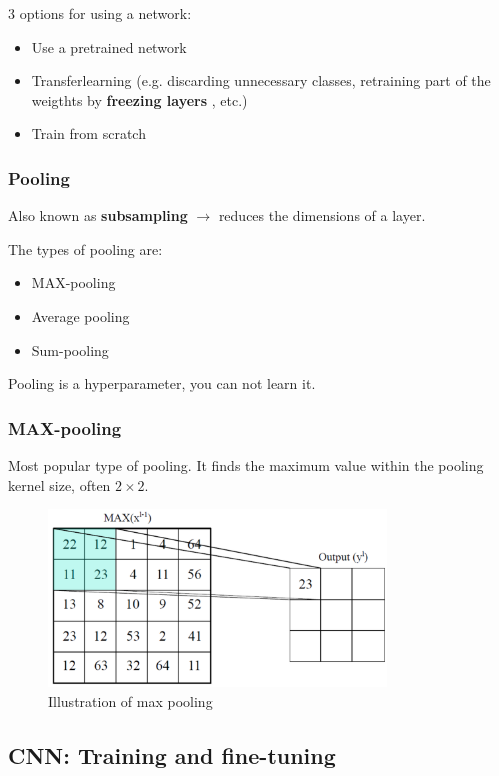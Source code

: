 \documentclass[a4paper]{article}
\begin{document}
3 options for using a network:
\begin{itemize}
	\item Use a pretrained network
	\item Transferlearning (e.g. discarding unnecessary classes, retraining part of the weigthts by \textbf{freezing layers} , etc.)
	\item Train from scratch
\end{itemize}

\subsubsection{Pooling}
Also known as \textbf{subsampling} $ \rightarrow $ reduces the dimensions of a layer.

The types of pooling are:
\begin{itemize}
	\item MAX-pooling
	\item Average pooling
	\item Sum-pooling
\end{itemize}

Pooling is a hyperparameter, you can not learn it. 

\subsubsection*{MAX-pooling}
Most popular type of pooling. 
It finds the maximum value within the pooling kernel size, often $ 2 \times 2 $. 


\begin{figure}[H]
\centering
\includegraphics[width=0.8\textwidth]{figures/max_pooling.png}
\caption{Illustration of max pooling}
\label{fig:max_pooling}
\end{figure} 

\newpage
\subsection{CNN: Training and fine-tuning}
\end{document}
